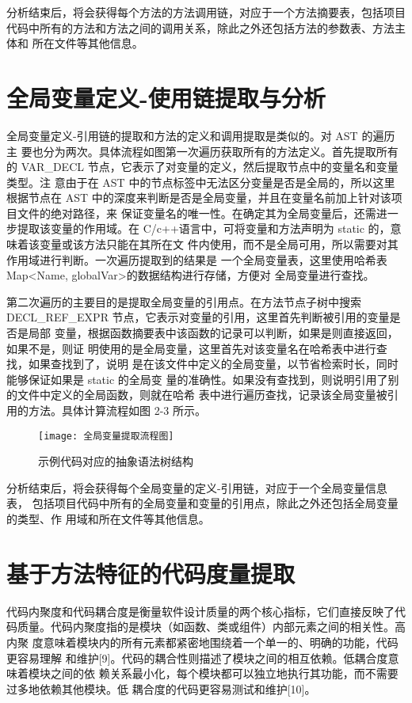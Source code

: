分析结束后，将会获得每个方法的方法调用链，对应于一个方法摘要表，包括项目
代码中所有的方法和方法之间的调用关系，除此之外还包括方法的参数表、方法主体和
所在文件等其他信息。

\section{全局变量定义-使用链提取与分析}

全局变量定义-引用链的提取和方法的定义和调用提取是类似的。对 AST 的遍历主
要也分为两次。具体流程如图第一次遍历获取所有的方法定义。首先提取所有的
VAR\_DECL 节点，它表示了对变量的定义，然后提取节点中的变量名和变量类型。注
意由于在 AST 中的节点标签中无法区分变量是否是全局的，所以这里根据节点在 AST
中的深度来判断是否是全局变量，并且在变量名前加上针对该项目文件的绝对路径，来
保证变量名的唯一性。在确定其为全局变量后，还需进一步提取该变量的作用域。在
C/c++语言中，可将变量和方法声明为 static 的，意味着该变量或该方法只能在其所在文
件内使用，而不是全局可用，所以需要对其作用域进行判断。一次遍历提取到的结果是
一个全局变量表，这里使用哈希表 Map<Name, globalVar>的数据结构进行存储，方便对
全局变量进行查找。

第二次遍历的主要目的是提取全局变量的引用点。在方法节点子树中搜索
DECL\_REF\_EXPR 节点，它表示对变量的引用，这里首先判断被引用的变量是否是局部
变量，根据函数摘要表中该函数的记录可以判断，如果是则直接返回，如果不是，则证
明使用的是全局变量，这里首先对该变量名在哈希表中进行查找，如果查找到了，说明
是在该文件中定义的全局变量，以节省检索时长，同时能够保证如果是 static 的全局变
量的准确性。如果没有查找到，则说明引用了别的文件中定义的全局函数，则就在哈希
表中进行遍历查找，记录该全局变量被引用的方法。具体计算流程如图 2-3 所示。

\begin{figure}[h]
\centering
\texttt{[image: 全局变量提取流程图]}
\caption{示例代码对应的抽象语法树结构}
\end{figure}


分析结束后，将会获得每个全局变量的定义-引用链，对应于一个全局变量信息表，
包括项目代码中所有的全局变量和变量的引用点，除此之外还包括全局变量的类型、作
用域和所在文件等其他信息。

\section{基于方法特征的代码度量提取}

代码内聚度和代码耦合度是衡量软件设计质量的两个核心指标，它们直接反映了代
码质量。代码内聚度指的是模块（如函数、类或组件）内部元素之间的相关性。高内聚
度意味着模块内的所有元素都紧密地围绕着一个单一的、明确的功能，代码更容易理解
和维护[9]。代码的耦合性则描述了模块之间的相互依赖。低耦合度意味着模块之间的依
赖关系最小化，每个模块都可以独立地执行其功能，而不需要过多地依赖其他模块。低
耦合度的代码更容易测试和维护[10]。



